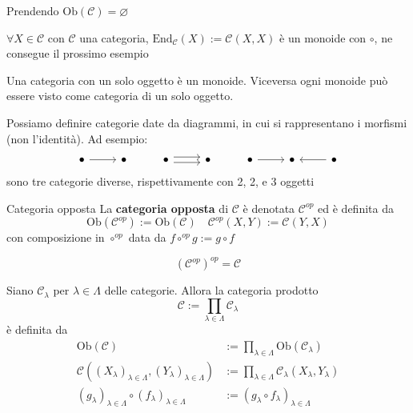 \begin{example}
    Prendendo \(\mathrm{Ob}{(\mathcal{C})} = \varnothing\)
\end{example}
\begin{remark}{}
    \(\forall X \in \mathcal{C}\) con \(\mathcal{C}\) una categoria, \(\mathrm{End}_\mathcal{C}{(X)} := \mathcal{C}{(X, X)}\) è un monoide con \(\circ\), ne consegue il prossimo esempio
\end{remark}
\begin{example}[Monoide]
    Una categoria con un solo oggetto è un monoide. Viceversa ogni monoide può
    essere visto come categoria di un solo oggetto.
\end{example}

\begin{example}[Diagrammi]
    Possiamo definire categorie date da diagrammi, in cui si rappresentano i
    morfismi (non l'identità). Ad esempio:
\[\begin{tikzcd}
	\bullet & \bullet & \bullet & \bullet & \bullet & \bullet & \bullet
	\arrow[from=1-1, to=1-2]
	\arrow[shift left, from=1-3, to=1-4]
	\arrow[shift right, from=1-3, to=1-4]
	\arrow[from=1-5, to=1-6]
	\arrow[from=1-7, to=1-6]
\end{tikzcd}\]
    sono tre categorie diverse, rispettivamente con 2, 2, e 3 oggetti
\end{example}

\begin{definition}{Categoria opposta}
    La \textbf{categoria opposta} di \(\mathcal{C}\) è denotata \(\mathcal{C}^{op}\) ed è definita
    da
    \[
        \mathrm{Ob}{(\mathcal{C}^{op})} := \mathrm{Ob}{(\mathcal{C})} \quad \mathcal{C}^{op}{(X, Y)} := \mathcal{C}{(Y, X)}
    \]
    con composizione in \(\circ^{op}\) data da \(f \circ^{op} g := g \circ f\) 
\end{definition}
\begin{remark}{}
    \[
      {(\mathcal{C}^{op})}^{op} = \mathcal{C}
    \]
\end{remark}
\begin{example}
    Siano \(\mathcal{C}_{\lambda} \) per \(\lambda \in \Lambda\) delle categorie. Allora
    la categoria prodotto
    \[
      \mathcal{C} := \prod_{\lambda \in \Lambda} \mathcal{C}_{\lambda} 
    \]
    è definita da 
    \begin{align*}
      \mathrm{Ob}{(\mathcal{C})} &:= \prod_{\lambda \in \Lambda} \mathrm{Ob}{(\mathcal{C}_\lambda)} \\
      \mathcal{C}{({(X_{\lambda} )}_{\lambda \in \Lambda}, {(Y_{\lambda} )}_{\lambda \in \Lambda} )} &:= \prod_{\lambda \in \Lambda} \mathcal{C}_{\lambda} {(X_{\lambda} , Y_\lambda)} \\
      {(g_{\lambda} )}_{\lambda \in \Lambda} \circ {(f_{\lambda} )}_{\lambda \in \Lambda} &:= {(g_{\lambda} \circ f_{\lambda} )}_{\lambda \in \Lambda} 
    \end{align*}
\end{example}

